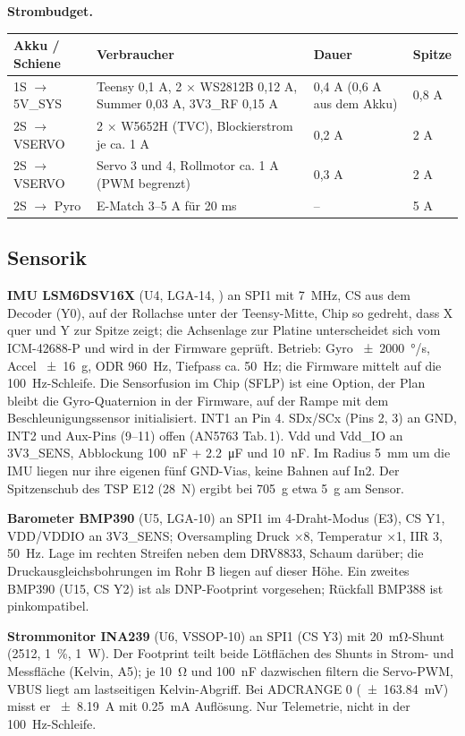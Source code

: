 \documentclass[10pt,a4paper,twoside]{article}
\begin{document}
\textbf{Strombudget.}

\begin{tabularx}{\textwidth}{L{30mm} X L{40mm} L{14mm}}
\toprule
\textbf{Akku / Schiene} & \textbf{Verbraucher} & \textbf{Dauer} & \textbf{Spitze}\\
\midrule
1S $\to$ 5V\_SYS & Teensy 0,1 A, 2 × WS2812B 0,12 A, Summer 0,03 A, 3V3\_RF 0,15 A & 0,4 A (0,6 A aus dem Akku) & 0,8 A\\
2S $\to$ VSERVO & 2 × W5652H (TVC), Blockierstrom je ca. 1 A & 0,2 A & 2 A\\
2S $\to$ VSERVO & Servo 3 und 4, Rollmotor ca. 1 A (PWM begrenzt) & 0,3 A & 2 A\\
2S $\to$ Pyro & E-Match 3--5 A für 20 ms & -- & 5 A\\
\bottomrule
\end{tabularx}

\subsection{Sensorik}
\textbf{IMU LSM6DSV16X} (U4, LGA-14, ) an SPI1 mit \SI{7}{MHz}, CS aus dem Decoder (Y0), auf der Rollachse unter der Teensy-Mitte, Chip so gedreht, dass X quer und Y zur Spitze zeigt; die Achsenlage zur Platine unterscheidet sich vom ICM-42688-P und wird in der Firmware geprüft. Betrieb: Gyro \SI{\pm 2000}{\degree/s}, Accel \SI{\pm 16}{g}, ODR \SI{960}{Hz}, Tiefpass ca. \SI{50}{Hz}; die Firmware mittelt auf die \SI{100}{Hz}-Schleife. Die Sensorfusion im Chip (SFLP) ist eine Option, der Plan bleibt die Gyro-Quaternion in der Firmware, auf der Rampe mit dem Beschleunigungssensor initialisiert. INT1 an Pin 4. SDx/SCx (Pins 2, 3) an GND, INT2 und Aux-Pins (9--11) offen (AN5763 Tab.\,1). Vdd und Vdd\_IO an 3V3\_SENS, Abblockung \SI{100}{nF} + \SI{2.2}{\micro F} und \SI{10}{nF}. Im Radius \SI{5}{mm} um die IMU liegen nur ihre eigenen fünf GND-Vias, keine Bahnen auf In2. Der Spitzenschub des TSP E12 (\SI{28}{N}) ergibt bei \SI{705}{g} etwa \SI{5}{g} am Sensor.

\textbf{Barometer BMP390} (U5, LGA-10) an SPI1 im 4-Draht-Modus (E3), CS Y1, VDD/VDDIO an 3V3\_SENS; Oversampling Druck ×8, Temperatur ×1, IIR 3, \SI{50}{Hz}. Lage im rechten Streifen neben dem DRV8833, Schaum darüber; die Druckausgleichsbohrungen im Rohr B liegen auf dieser Höhe. Ein zweites BMP390 (U15, CS Y2) ist als DNP-Footprint vorgesehen; Rückfall BMP388 ist pinkompatibel.

\textbf{Strommonitor INA239} (U6, VSSOP-10) an SPI1 (CS Y3) mit \SI{20}{\milli\ohm}-Shunt (2512, \SI{1}{\percent}, \SI{1}{W}). Der Footprint teilt beide Lötflächen des Shunts in Strom- und Messfläche (Kelvin, A5); je \SI{10}{\ohm} und \SI{100}{nF} dazwischen filtern die Servo-PWM, VBUS liegt am lastseitigen Kelvin-Abgriff. Bei ADCRANGE 0 (\SI{\pm 163.84}{mV}) misst er \SI{\pm 8.19}{A} mit \SI{0.25}{mA} Auflösung. Nur Telemetrie, nicht in der \SI{100}{Hz}-Schleife.
\end{document}
